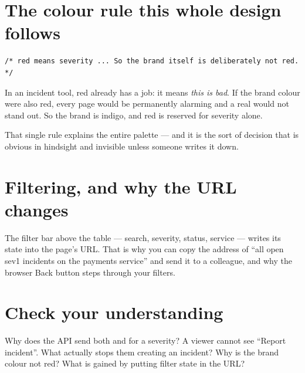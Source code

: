 \section{The colour rule this whole design follows}

\begin{lstlisting}
/* red means severity ... So the brand itself is deliberately not red. */
\end{lstlisting}

In an incident tool, red already has a job: it means \emph{this is bad}. If the
brand colour were also red, every page would be permanently alarming and a real
 would not stand out. So the brand is indigo, and red is reserved
for severity alone.

That single rule explains the entire palette --- and it is the sort of decision
that is obvious in hindsight and invisible unless someone writes it down.

\section{Filtering, and why the URL changes}

The filter bar above the table --- search, severity, status, service --- writes
its state into the page's URL. That is why you can copy the address of
``all open sev1 incidents on the payments service'' and send it to a colleague,
and why the browser Back button steps through your filters.


\section{Check your understanding}

\begin{itemize}[leftmargin=1.4cm]
\cbox Why does the API send both  and  for a severity?
\cbox A viewer cannot see ``Report incident''. What actually stops them creating
  an incident?
\cbox Why is the brand colour not red?
\cbox What is gained by putting filter state in the URL?
\end{itemize}
